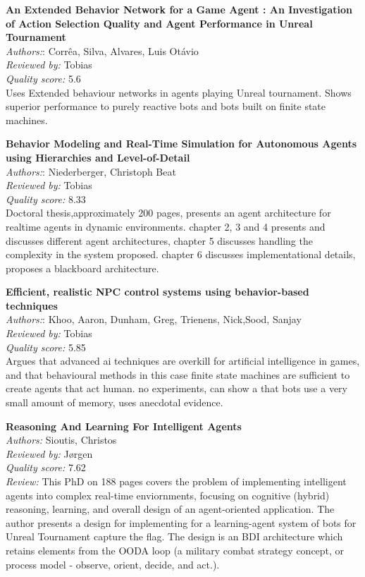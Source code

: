 \textbf{An Extended Behavior Network for a Game Agent : An Investigation of Action Selection Quality and Agent Performance in Unreal Tournament}\\
\textit{Authors:}: Corrêa, Silva, Alvares, Luis Otávio\\
\textit{Reviewed by:} Tobias\\
\textit{Quality score:} 5.6\\
Uses Extended behaviour networks in agents playing Unreal tournament. Shows superior performance to purely reactive bots and bots built on finite state machines.



\textbf{Behavior Modeling and Real-Time Simulation for Autonomous Agents using Hierarchies and Level-of-Detail}\\
\textit{Authors:}: Niederberger, Christoph Beat\\
\textit{Reviewed by:} Tobias\\
\textit{Quality score:} 8.33\\
Doctoral thesis,approximately 200 pages, presents an agent architecture for realtime agents in dynamic environments. chapter 2, 3 and 4 presents and discusses different agent architectures, chapter 5 discusses handling the complexity in the system proposed. chapter 6 discusses implementational details, proposes a blackboard architecture.

\textbf{Efficient, realistic NPC control systems using behavior-based techniques}\\
\textit{Authors:}: Khoo, Aaron, Dunham, Greg, Trienens, Nick,Sood, Sanjay\\
\textit{Reviewed by:} Tobias\\
\textit{Quality score:} 5.85\\
Argues that advanced ai techniques are overkill for artificial intelligence in games, and that behavioural methods in this case finite state machines are sufficient to create agents that act human. no experiments, can show a that bots use a very small amount of memory, uses  anecdotal evidence.

\textbf{Reasoning And Learning For Intelligent Agents}\\
\textit{Authors:} Sioutis, Christos\\
\textit{Reviewed by:} Jørgen\\
\textit{Quality score:} 7.62\\
\textit{Review:} This PhD on 188 pages covers the problem of implementing intelligent agents into complex real-time enviornments, focusing on cognitive (hybrid) reasoning, learning, and overall design of an agent-oriented application.
The author presents a design for implementing for a learning-agent system of bots for Unreal Tournament capture the flag. The design is an BDI architecture which retains elements from the OODA loop (a military combat strategy concept, or process model - observe, orient, decide, and act.). 


